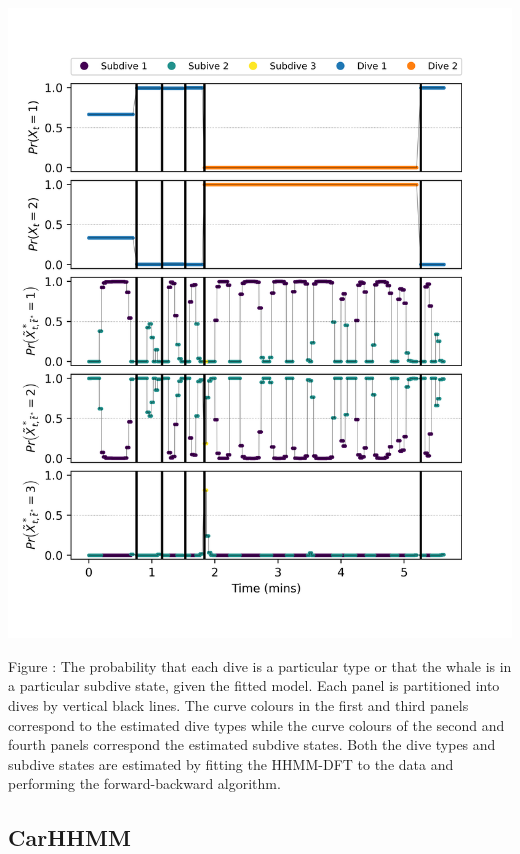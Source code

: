 \documentclass{article}
\begin{document}
        \begin{center}
        \includegraphics[width=6in]{../Plots/2019/20190902-182840-CATs_OB_1_0_267_HHMM_decoded_states.png}
        \end{center}
        
        \noindent Figure : The probability that each dive is a particular type or that the whale is in a particular subdive state, given the fitted model. Each panel is partitioned into dives by vertical black lines. The curve colours in the first and third panels correspond to the estimated dive types while the curve colours of the second and fourth panels correspond the estimated subdive states. Both the dive types and subdive states are estimated by fitting the HHMM-DFT to the data and performing the forward-backward algorithm.
        \addtocounter{fignum}{1}
        
        \subsection{CarHHMM}
        
\end{document}

